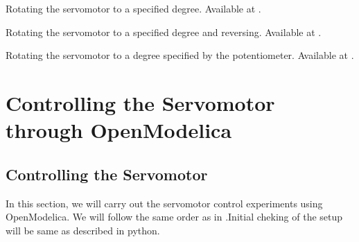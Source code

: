 \begin{juliacode}
   {Rotating
    the servomotor to a specified degree.  Available at
    .}
  \label{julia:servo-init}
  
\end{juliacode}

\begin{juliacode}
   {Rotating
    the servomotor to a specified degree and reversing.  Available at
    .}
  \label{julia:servo-reverse}
  
\end{juliacode}

\begin{juliacode}
  \label{julia:servo-loop}
  
\end{juliacode}

\begin{juliacode}
   {Rotating the servomotor to a degree specified by
    the potentiometer.  Available at .}
  \label{julia:servo-pot}
  
\end{juliacode}

\section{Controlling the Servomotor through OpenModelica}
\subsection{Controlling the Servomotor}
\label{sec:servo-OpenModelica}
In this section, we will carry out the servomotor control experiments
using OpenModelica.  We will follow the same order as in
.Initial cheking of the setup will be same as
described in python.

